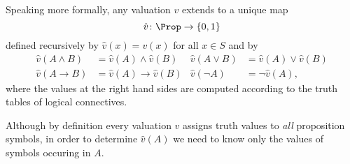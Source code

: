 

\setcounter{section}{1}
\setcounter{subsection}{3}
\setcounter{dfn}{3}


Speaking more formally, any valuation $v$ extends to a unique map
\[
\hat{v} \colon \Prop \to \{0,1\}
\]
defined recursively by $\hat{v}(x) = v(x)$ for all $x \in S$ and by
\begin{align*}
\hat{v}(A \wedge B) &= \hat{v}(A) \wedge \hat{v}(B) & \hat{v}(A \vee B) &= \hat{v}(A) \vee \hat{v}(B)\\
\hat{v}(A \to B) &= \hat{v}(A) \to \hat{v}(B) & \hat{v}(\neg A) &= \neg \hat{v}(A),
\end{align*}
where the values at the right hand sides are computed according to the truth tables of logical connectives.

Although by definition every valuation $v$ assigns truth values to \emph{all} proposition symbols,
in order to determine $\hat{v}(A)$ we need to know only the values of symbols occuring in $A$.



